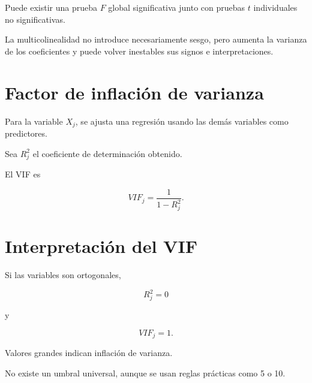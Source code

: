 \documentclass[
  spanish,
  10.5pt,
  letterpaper,
  DIV=11,
  numbers=noendperiod,
  oneside,
  open=any]{scrreprt}
\theoremstyle{definition}
\theoremstyle{definition}
\theoremstyle{plain}
\theoremstyle{remark}
\begin{document}
Puede existir una prueba \(F\) global significativa junto con pruebas
\(t\) individuales no significativas.

\begin{tcolorbox}[enhanced jigsaw, arc=.35mm, bottomrule=.15mm, bottomtitle=1mm, breakable, colback=white, colbacktitle=quarto-callout-warning-color!10!white, colframe=quarto-callout-warning-color-frame, coltitle=black, left=2mm, leftrule=.75mm, opacityback=0, opacitybacktitle=0.6, rightrule=.15mm, title=\textcolor{quarto-callout-warning-color}{\faExclamationTriangle}\hspace{0.5em}{Multicolinealidad}, titlerule=0mm, toprule=.15mm, toptitle=1mm]

La multicolinealidad no introduce necesariamente sesgo, pero aumenta la
varianza de los coeficientes y puede volver inestables sus signos e
interpretaciones.

\end{tcolorbox}

\section*{Factor de inflación de
varianza}\label{factor-de-inflaciuxf3n-de-varianza}


Para la variable \(X_j\), se ajusta una regresión usando las demás
variables como predictores.

Sea \(R_j^2\) el coeficiente de determinación obtenido.

El VIF es

\[
VIF_j
=
\frac{
1
}{
1-R_j^2
}.
\]

\section*{Interpretación del VIF}\label{interpretaciuxf3n-del-vif}


Si las variables son ortogonales,

\[
R_j^2=0
\]

y

\[
VIF_j=1.
\]

Valores grandes indican inflación de varianza.

No existe un umbral universal, aunque se usan reglas prácticas como 5 o
10.
\end{document}
